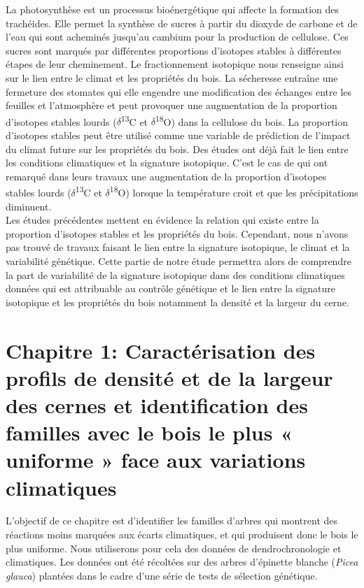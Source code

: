 \documentclass[a4paper,12pt]{report}
\newcommand{\Ctreize}{$\delta$\textsuperscript{13}C\xspace}
\newcommand{\Odixhuit}{$\delta$\textsuperscript{18}O\xspace}
\begin{document}
\begin{itemize}
	La photosynthèse est un processus bioénergétique qui affecte la formation des trachéides. Elle permet la synthèse de sucres à partir du dioxyde de carbone et de l'eau qui sont acheminés jusqu'au cambium pour la production de cellulose. Ces sucres sont marqués par différentes proportions d'isotopes stables à différentes étapes de leur cheminement. Le fractionnement isotopique nous renseigne ainsi sur le lien entre le climat et les propriétés du bois. La sécheresse entraîne une fermeture des stomates \citep{Farquhar1989, Farquhar1993, Nicolas2017} qui elle engendre une modification des échanges entre les feuilles et l'atmosphère et peut provoquer une augmentation de la proportion d'isotopes stables lourds (\Ctreize et \Odixhuit) \citep{McCarroll2004,Skomarkova2006,Vaganov2009,Cernusak2015} dans la cellulose du bois. La proportion d'isotopes stables peut être utilisé comme une variable de prédiction de l'impact du climat future sur les propriétés du bois. Des études ont déjà fait le lien entre les conditions climatiques et la signature isotopique. C'est le cas de  \cite{Seftigen2011} qui ont remarqué dans leurs travaux une augmentation de la proportion d'isotopes stables lourds (\Ctreize et \Odixhuit) lorsque la température croit et que les précipitations diminuent.\\
	
	Les études précédentes mettent en évidence la relation qui existe entre la proportion d'isotopes stables et les propriétés du bois. Cependant, nous n'avons pas trouvé de travaux faisant le lien entre la signature isotopique, le climat et la variabilité génétique. Cette partie de notre étude permettra alors de comprendre la part de variabilité de la signature isotopique dans des conditions climatiques données qui est attribuable au contrôle génétique et le lien entre la signature isotopique et les propriétés du bois notamment la densité et la largeur du cerne. 
	
	
\end{itemize} 


\chapter{Chapitre 1: Caractérisation des profils de densité et de la largeur des cernes et identification des familles avec le bois le plus « uniforme » face aux variations climatiques}


L'objectif de ce chapitre est d'identifier les familles d'arbres qui montrent des réactions moins marquées aux écarts climatiques, et qui produisent donc le bois le plus uniforme. Nous utiliserons pour cela des données de dendrochronologie et climatiques. Les données ont été récoltées sur des arbres d'épinette blanche (\textit{Picea glauca}) plantées dans le cadre d'une série de tests de sélection génétique. 
\end{document}
